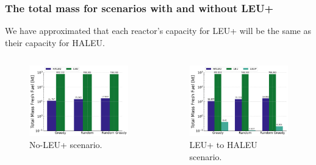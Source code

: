 \documentclass[9pt]{beamer}
\begin{document}
  \begin{frame}
    \frametitle{The total mass for scenarios with and without LEU+}
    We have approximated that each reactor's capacity for LEU+ will be the same as their capacity for HALEU.
    \begin{columns}
      \begin{column}{0.5\textwidth}
        \begin{figure}
          \centering
          \includegraphics[width=\textwidth]{../images/final_cumulative_fuel_of.pdf}
          \caption{No-LEU+ scenario.}
        \end{figure}
      \end{column}
      \begin{column}{0.5\textwidth}
        \begin{figure}
          \centering
          \includegraphics[width=\textwidth]{../images/final_cumulative_fuel_mf.pdf}
          \caption{LEU+ to HALEU scenario.}
        \end{figure}
      \end{column}
    \end{columns}
  \end{frame}
\end{document}
